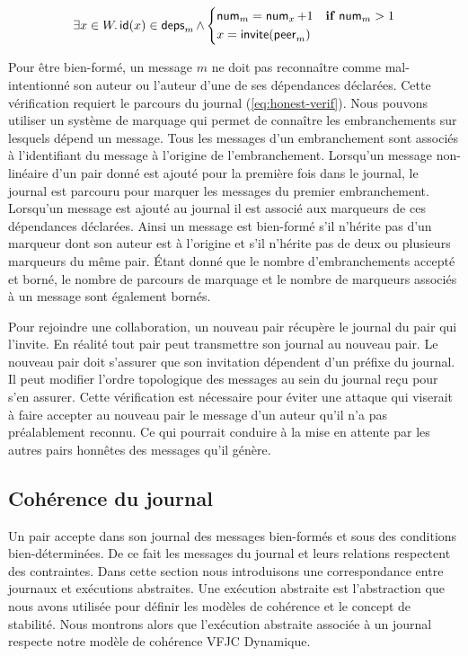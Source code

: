 \begin{equation*}
    \exists x \in W \ldotp \operatorname{\mathsf{id}}(x) \in \operatorname{\mathsf{deps}}_m \land \begin{dcases}
    \operatorname{\mathsf{num}}_m = \operatorname{\mathsf{num}}_x + 1 & \mathrel{\mathbf{if}} \operatorname{\mathsf{num}}_m > 1\\
    x = \operatorname{\mathsf{invite}}(\operatorname{\mathsf{peer}}_m)
    \end{dcases}
\end{equation*}

Pour être bien-formé, un message $m$ ne doit pas reconnaître comme mal-intentionné son auteur ou l'auteur d'une de ses dépendances déclarées.
Cette vérification requiert le parcours du journal (\autoref{eq:honest-verif}).
Nous pouvons utiliser un système de marquage qui permet de connaître les embranchements sur lesquels dépend un message.
Tous les messages d'un embranchement sont associés à l'identifiant du message à l'origine de l'embranchement.
Lorsqu'un message non-linéaire d'un pair donné est ajouté pour la première fois dans le journal, le journal est parcouru pour marquer les messages du premier embranchement.
Lorsqu'un message est ajouté au journal il est associé aux marqueurs de ces dépendances déclarées.
Ainsi un message est bien-formé s'il n'hérite pas d'un marqueur dont son auteur est à l'origine et s'il n'hérite pas de deux ou plusieurs marqueurs du même pair.
Étant donné que le nombre d'embranchements accepté et borné, le nombre de parcours de marquage et le nombre de marqueurs associés à un message sont également bornés.

Pour rejoindre une collaboration, un nouveau pair récupère le journal du pair qui l'invite.
En réalité tout pair peut transmettre son journal au nouveau pair.
Le nouveau pair doit s'assurer que son invitation dépendent d'un préfixe du journal.
Il peut modifier l'ordre topologique des messages au sein du journal reçu pour s'en assurer.
Cette vérification est nécessaire pour éviter une attaque qui viserait à faire accepter au nouveau pair le message d'un auteur qu'il n'a pas préalablement reconnu.
Ce qui pourrait conduire à la mise en attente par les autres pairs honnêtes des messages qu'il génère.


\subsection{Cohérence du journal}

Un pair accepte dans son journal des messages bien-formés et sous des conditions bien-déterminées.
De ce fait les messages du journal et leurs relations respectent des contraintes.
Dans cette section nous introduisons une correspondance entre journaux et exécutions abstraites.
Une exécution abstraite est l'abstraction que nous avons utilisée pour définir les modèles de cohérence et le concept de stabilité.
Nous montrons alors que l'exécution abstraite associée à un journal respecte notre modèle de cohérence \acl{VFJC} Dynamique.

